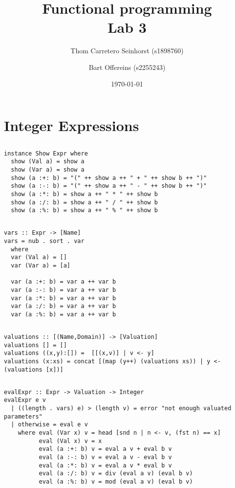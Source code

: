 \documentclass[a4paper,11pt]{article}
\author{Thom Carretero Seinhorst (s1898760) \and Bart Offereins (s2255243)}
\date{\today}
\title{Functional programming \\Lab 3}
\begin{document}
  \maketitle

\section{Integer Expressions}
\subsection{}
\begin{lstlisting}
instance Show Expr where
  show (Val a) = show a
  show (Var a) = show a
  show (a :+: b) = "(" ++ show a ++ " + " ++ show b ++ ")"
  show (a :-: b) = "(" ++ show a ++ " - " ++ show b ++ ")"
  show (a :*: b) = show a ++ " * " ++ show b
  show (a :/: b) = show a ++ " / " ++ show b
  show (a :%: b) = show a ++ " % " ++ show b
\end{lstlisting}

\subsection{}
\begin{lstlisting}
vars :: Expr -> [Name]
vars = nub . sort . var
  where
  var (Val a) = []
  var (Var a) = [a]

  var (a :+: b) = var a ++ var b
  var (a :-: b) = var a ++ var b
  var (a :*: b) = var a ++ var b
  var (a :/: b) = var a ++ var b
  var (a :%: b) = var a ++ var b
\end{lstlisting}

\subsection{}
\begin{lstlisting}
valuations :: [(Name,Domain)] -> [Valuation]
valuations [] = []
valuations ((x,y):[]) =  [[(x,v)] | v <- y]
valuations (x:xs) = concat [(map (y++) (valuations xs)) | y <- (valuations [x])]
\end{lstlisting}

\subsection{}
\begin{lstlisting}
evalExpr :: Expr -> Valuation -> Integer
evalExpr e v
  | ((length . vars) e) > (length v) = error "not enough valuated parameters"
  | otherwise = eval e v
    where eval (Var x) v = head [snd n | n <- v, (fst n) == x] 
          eval (Val x) v = x
          eval (a :+: b) v = eval a v + eval b v
          eval (a :-: b) v = eval a v - eval b v
          eval (a :*: b) v = eval a v * eval b v
          eval (a :/: b) v = div (eval a v) (eval b v)
          eval (a :%: b) v = mod (eval a v) (eval b v)
\end{lstlisting}
\end{document}
